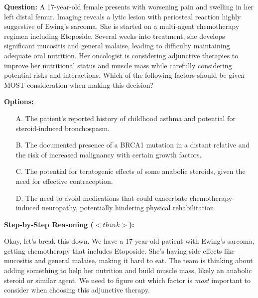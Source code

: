 \documentclass{article}
\theoremstyle{plain}
\theoremstyle{definition}
\theoremstyle{remark}
\begin{document}
\begin{tcolorbox}[
    colframe=medicalblue,
    colback=white,
    title={\textbf{Detailed Compositional Reasoning | Category: Neoplasms | Difficulty: 5 | Num Hops: 5}},
    colbacktitle=medicalblue,
    coltitle=white,
    fonttitle=\sffamily\bfseries,
    sharp corners,
    boxrule=1pt,
    enhanced,
    breakable,
    attach boxed title to top left={yshift=-2mm,xshift=2mm},
    boxed title style={sharp corners,colframe=medicalblue}
]
    \small
    \textbf{Question:} 
    A 17-year-old female presents with worsening pain and swelling in her left distal femur. Imaging reveals a lytic lesion with periosteal reaction highly suggestive of Ewing's sarcoma. She is started on a multi-agent chemotherapy regimen including Etoposide. Several weeks into treatment, she develops significant mucositis and general malaise, leading to difficulty maintaining adequate oral nutrition. Her oncologist is considering adjunctive therapies to improve her nutritional status and muscle mass while carefully considering potential risks and interactions. Which of the following factors should be given MOST consideration when making this decision?

    \vspace{0.2cm}
    \textbf{Options:}
    \begin{itemize}[leftmargin=*, nosep]
        \item[A.] The patient's reported history of childhood asthma and potential for steroid-induced bronchospasm.
        \item[B.] The documented presence of a BRCA1 mutation in a distant relative and the risk of increased malignancy with certain growth factors.
        \item[C.] The potential for teratogenic effects of some anabolic steroids, given the need for effective contraception.
        \item[D.] The need to avoid medications that could exacerbate chemotherapy-induced neuropathy, potentially hindering physical rehabilitation.
    \end{itemize}

    \vspace{0.4cm}
    
    \noindent\colorbox{thoughtback}{%
    \begin{minipage}{\dimexpr\linewidth-4mm}
        \vspace{1mm}
        \footnotesize
        \textbf{Step-by-Step Reasoning ($<think>$):}
        
        \vspace{0.2cm}
        Okay, let's break this down. We have a 17-year-old patient with \colorbox{pathhighlight}{Ewing's sarcoma,} getting chemotherapy that includes \colorbox{pathhighlight}{Etoposide.} She's having side effects like mucositis and general malaise, making it hard to eat. The team is thinking about adding something to help her nutrition and build muscle mass, likely an anabolic steroid or similar agent. We need to figure out which factor is \textit{most} important to consider when choosing this adjunctive therapy.


\end{minipage}}
\end{tcolorbox}
\end{document}
